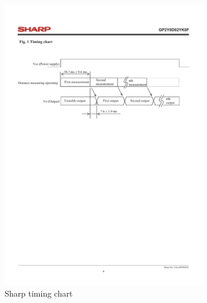 \begin{figure}[H]
\begin{center}
	\includegraphics[width=0.8\textwidth]{images/SharpTiming.pdf}
		\caption[Sharp timing chart] {Sharp timing chart\cite{sharp}}
	\label{fig:Sharptiming}
\end{center}
\end{figure}



